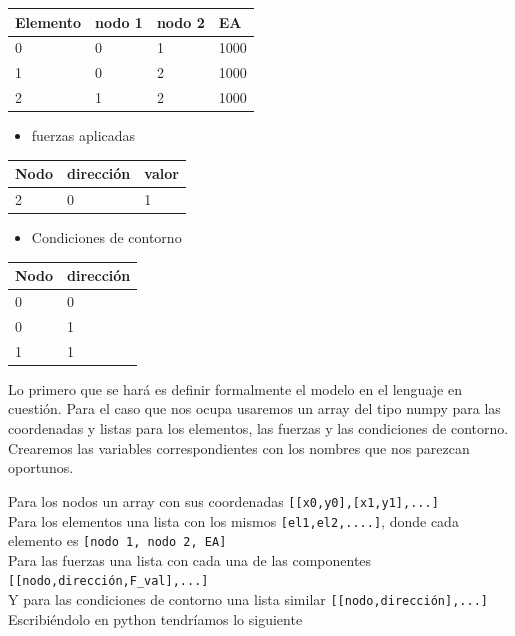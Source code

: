 \documentclass[11pt]{article}
\providecommand{\tightlist}{%
      \setlength{\itemsep}{0pt}\setlength{\parskip}{0pt}}
\begin{document}
\begin{longtable}[]{@{}llll@{}}
\toprule
Elemento & nodo 1 & nodo 2 & EA\tabularnewline
\midrule
\endhead
0 & 0 & 1 & 1000\tabularnewline
1 & 0 & 2 & 1000\tabularnewline
2 & 1 & 2 & 1000\tabularnewline
\bottomrule
\end{longtable}

\begin{itemize}
\tightlist
\item
  fuerzas aplicadas
\end{itemize}

\begin{longtable}[]{@{}lll@{}}
\toprule
Nodo & dirección & valor\tabularnewline
\midrule
\endhead
2 & 0 & 1\tabularnewline
\bottomrule
\end{longtable}

\begin{itemize}
\tightlist
\item
  Condiciones de contorno
\end{itemize}

\begin{longtable}[]{@{}ll@{}}
\toprule
Nodo & dirección\tabularnewline
\midrule
\endhead
0 & 0\tabularnewline
0 & 1\tabularnewline
1 & 1\tabularnewline
\bottomrule
\end{longtable}

Lo primero que se hará es definir formalmente el modelo en el lenguaje
en cuestión. Para el caso que nos ocupa usaremos un array del tipo numpy
para las coordenadas y listas para los elementos, las fuerzas y las
condiciones de contorno. Crearemos las variables correspondientes con
los nombres que nos parezcan oportunos.

    Para los nodos un array con sus coordenadas
\texttt{{[}{[}x0,y0{]},{[}x1,y1{]},...{]}}\\
Para los elementos una lista con los mismos \texttt{{[}el1,el2,....{]}},
donde cada elemento es \texttt{{[}nodo\ 1,\ nodo\ 2,\ EA{]}}\\
Para las fuerzas una lista con cada una de las componentes
\texttt{{[}{[}nodo,dirección,F\_val{]},...{]}}\\
Y para las condiciones de contorno una lista similar
\texttt{{[}{[}nodo,dirección{]},...{]}}\\
Escribiéndolo en python tendríamos lo siguiente
\end{document}
